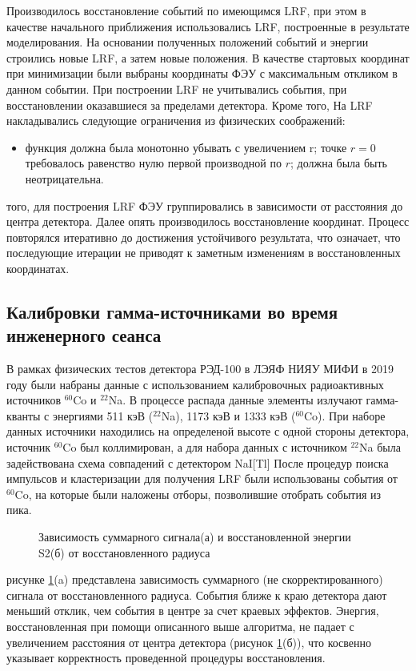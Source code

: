 Производилось восстановление событий по имеющимся LRF, при этом в качестве начального приближения использовались LRF, построенные в результате моделирования. На основании полученных положений событий и энергии строились новые LRF, а затем новые положения. В качестве стартовых координат при минимизации были выбраны координаты ФЭУ с максимальным откликом в данном событии. При построении LRF не учитывались события, при восстановлении оказавшиеся за пределами детектора. Кроме того, На LRF накладывались следующие ограничения из физических соображений:
\begin{itemize}
    \item функция должна была монотонно убывать с увеличением r;
     точке $r = 0$ требовалось равенство нулю первой производной по $r$; 
     должна была быть неотрицательна.
\end{itemize}
 того, для построения LRF ФЭУ группировались в зависимости от расстояния до центра детектора.
Далее опять производилось восстановление координат. Процесс повторялся итеративно до достижения устойчивого результата, что означает, что последующие итерации не приводят к заметным изменениям в восстановленных координатах.

\subsection{Калибровки гамма-источниками во время инженерного сеанса}
\label{subsect3_3_4}
В рамках физических тестов детектора РЭД-100 в ЛЭЯФ НИЯУ МИФИ в 2019 году были набраны данные с использованием калибровочных радиоактивных источников $^{60}$Co и $^{22}$Na. В процессе распада данные элементы излучают гамма-кванты с энергиями 511 кэВ ($^{22}$Na), 1173 кэВ и 1333 кэВ ($^{60}$Co). При наборе данных источники находились на определеной высоте с одной стороны детектора, источник $^{60}$Co был коллимирован, а для набора данных с источником $^{22}$Na была задействована схема совпадений с детектором NaI[Tl] После процедур поиска импульсов и кластеризации для получения LRF были использованы события от $^{60}$Co, на которые были наложены отборы, позволившие отобрать события из пика.
\begin{figure}[hbt]
	\caption{Зависимость суммарного сигнала(а) и восстановленной энергии S2(б) от восстановленного радиуса}
	\label{img:s2vsR2019}
\end{figure}
 рисунке \ref{img:s2vsR2019}(a) представлена зависимость суммарного (не скорректированного) сигнала от восстановленного радиуса. События ближе к краю детектора дают меньший отклик, чем события в центре за счет краевых эффектов. Энергия, восстановленная при помощи описанного выше алгоритма, не падает с увеличением расстояния от центра детектора (рисунок \ref{img:s2vsR2019}(б)), что косвенно указывает корректность проведенной процедуры восстановления. 

